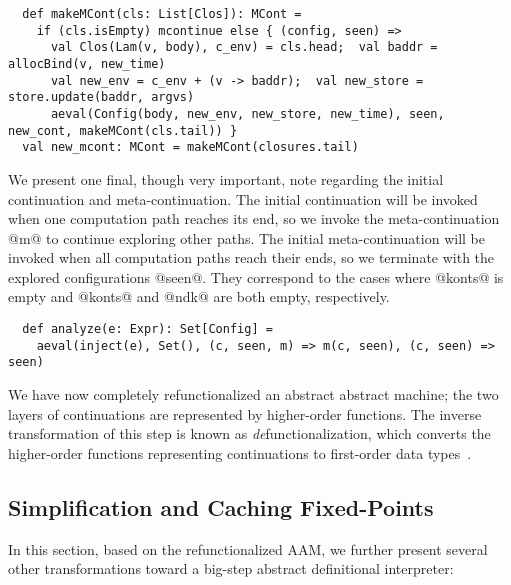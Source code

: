 \documentclass[acmsmall, screen]{acmart}\settopmatter{}
\begin{document}
\begin{lstlisting}
  def makeMCont(cls: List[Clos]): MCont =
    if (cls.isEmpty) mcontinue else { (config, seen) =>
      val Clos(Lam(v, body), c_env) = cls.head;  val baddr = allocBind(v, new_time)
      val new_env = c_env + (v -> baddr);  val new_store = store.update(baddr, argvs)
      aeval(Config(body, new_env, new_store, new_time), seen, new_cont, makeMCont(cls.tail)) }
  val new_mcont: MCont = makeMCont(closures.tail)
\end{lstlisting}

We present one final, though very important, note regarding the initial continuation and meta-continuation.
The initial continuation will be invoked when one computation path reaches its end,
so we invoke the meta-continuation @m@ to continue exploring other paths.
The initial meta-continuation will be invoked when all computation paths reach their ends,
so we terminate with the explored configurations @seen@. They correspond to the
cases where @konts@ is empty and @konts@ and @ndk@ are both empty, respectively.

\begin{lstlisting}
  def analyze(e: Expr): Set[Config] =
    aeval(inject(e), Set(), (c, seen, m) => m(c, seen), (c, seen) => seen)
\end{lstlisting}

We have now completely refunctionalized an abstract abstract machine; the two layers
of continuations are represented by higher-order functions. The inverse transformation
of this step is known as \textit{de}functionalization, which converts the higher-order functions
representing continuations to first-order data
types~\cite{Danvy:2001:DW:773184.773202, Danvy:2008:DIP:1411204.1411206}.

\subsection{Simplification and Caching Fixed-Points}

In this section, based on the refunctionalized AAM, we
further present several other transformations toward a big-step abstract
definitional interpreter:
\end{document}
